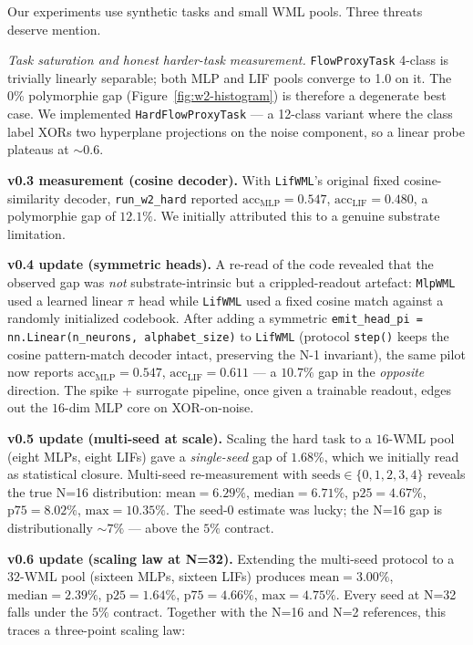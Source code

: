 \documentclass[10pt,twocolumn]{article}
\begin{document}
Our experiments use synthetic tasks and small WML pools. Three threats deserve mention.

\textit{Task saturation and honest harder-task measurement.} \texttt{FlowProxyTask} 4-class is trivially linearly separable; both MLP and LIF pools converge to 1.0 on it. The 0\% polymorphie gap (Figure~\ref{fig:w2-histogram}) is therefore a degenerate best case. We implemented \texttt{HardFlowProxyTask} --- a 12-class variant where the class label XORs two hyperplane projections on the noise component, so a linear probe plateaus at $\sim 0.6$.

\textbf{v0.3 measurement (cosine decoder).} With \texttt{LifWML}'s original fixed cosine-similarity decoder, \texttt{run\_w2\_hard} reported $\text{acc}_{\text{MLP}} = 0.547$, $\text{acc}_{\text{LIF}} = 0.480$, a polymorphie gap of $12.1\%$. We initially attributed this to a genuine substrate limitation.

\textbf{v0.4 update (symmetric heads).} A re-read of the code revealed that the observed gap was \emph{not} substrate-intrinsic but a crippled-readout artefact: \texttt{MlpWML} used a learned linear $\pi$ head while \texttt{LifWML} used a fixed cosine match against a randomly initialized codebook. After adding a symmetric \texttt{emit\_head\_pi = nn.Linear(n\_neurons, alphabet\_size)} to \texttt{LifWML} (protocol \texttt{step()} keeps the cosine pattern-match decoder intact, preserving the N-1 invariant), the same pilot now reports $\text{acc}_{\text{MLP}} = 0.547$, $\text{acc}_{\text{LIF}} = 0.611$ --- a $10.7\%$ gap in the \emph{opposite} direction. The spike + surrogate pipeline, once given a trainable readout, edges out the $16$-dim MLP core on XOR-on-noise.

\textbf{v0.5 update (multi-seed at scale).} Scaling the hard task to a $16$-WML pool (eight MLPs, eight LIFs) gave a \emph{single-seed} gap of $1.68\%$, which we initially read as statistical closure. Multi-seed re-measurement with $\text{seeds} \in \{0,1,2,3,4\}$ reveals the true N=16 distribution: $\text{mean} = 6.29\%$, $\text{median} = 6.71\%$, $\text{p25} = 4.67\%$, $\text{p75} = 8.02\%$, $\text{max} = 10.35\%$. The seed-0 estimate was lucky; the N=16 gap is distributionally $\sim 7\%$ --- above the $5\%$ contract.

\textbf{v0.6 update (scaling law at N=32).} Extending the multi-seed protocol to a $32$-WML pool (sixteen MLPs, sixteen LIFs) produces $\text{mean} = 3.00\%$, $\text{median} = 2.39\%$, $\text{p25} = 1.64\%$, $\text{p75} = 4.66\%$, $\text{max} = 4.75\%$. Every seed at N=32 falls under the $5\%$ contract. Together with the N=16 and N=2 references, this traces a three-point scaling law:
\end{document}
